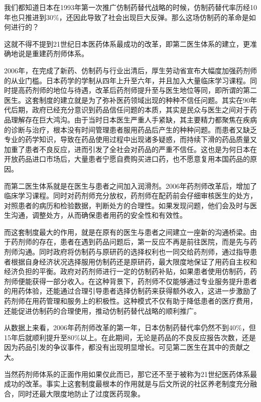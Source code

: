 我们都知道日本在1993年第一次推广仿制药替代战略的时候，仿制药替代率历经10年也只推进到30\%，还因此导致了社会出现巨大反弹。那么这场仿制药的革命是如何进行的？

这就不得不提到21世纪日本医药体系最成功的改革，即第二医生体系的建立，更准确地说是重建药剂师体系。

2006年，在完成了新药、仿制药与行业出清后，厚生劳动省宣布大幅度加强药剂师的从业门槛。日本药学的学制从四年上升至六年，并且加入大量临床学习课程。同时提高药剂师的地位与待遇，改革后药剂师提升至与医生地位等同，即所谓的第二医生。这套制度的建立就是为了弥补医药领域出现的种种不信任问题。其实在90年代后期，政府已经充分意识到药品信任问题的本质，其实是民众与医生之间对于药品理解存在巨大鸿沟。由于当时日本医生严重人手紧缺，其主要精力都聚焦在疾病的诊断与治疗，根本没有时间管理患者服用药品后产生的种种问题。而患者又缺乏专业的药学知识，导致在药品使用过程中出现诸多疑惑，而持续下滑的药品质量又加重了患者不良反应，进而引发了全社会对药品的严重不信任。这也是为何日本在开放药品进口市场后，大量患者宁愿自费购买进口药，也不愿意复用本国药品的原因。

而第二医生体系就是在医生与患者之间加入润滑剂。2006年药剂师改革后，增加了临床学习课程。同时对药剂师充分放权，药剂师在配药前会仔细审核医生的处方，对照患者的病历和检验数据，判断处方的合理性。如果发现问题，他们会及时与医生沟通，调整处方，从而确保患者用药的安全性和有效性。

而这套制度最大的作用，就是在原有的医生与患者之间建立一座新的沟通桥梁。由于药剂师的存在，患者在遇到药品问题后，第一反应不再是前往医院，而是先与药剂师沟通。同时政府将仿制药与原研药的选择权利也一同交给药剂师，通过指导患者根据自身经济状况选择服用仿制药还是原研药，最大限度地保证了用药自主权和经济负担的平衡。政府对药剂师进行一定的仿制药补贴，如果患者使用仿制药，药剂师便能获得一部分收入。在这种背景下，药剂师不仅能够通过专业服务提升患者的用药体验，还能通过合理引导患者选择仿制药来获得额外收入，这进一步激励了药剂师在用药管理和服务上的积极性。这种模式不仅有助于降低患者的医疗费用，还能促进仿制药的合理使用，推动仿制药替代战略的顺利推广。

从数据上来看，2006年药剂师改革的第一年，日本仿制药替代率仍然不到40\%，但15年后就顺利提升至80\%以上。在此期间，无论是药品的不良反应报告次数，还是因为药品引发的争议事件，都没有出现明显增长。可见第二医生在其中的贡献之大。

当然药剂师体系的正面作用如果仅此而已，那它还不至于被称为21世纪医药体系最成功的改革。事实上这套制度最根本的作用就是与后文所说的社区养老制度充分融合，同时还最大限度地防止了过度医药现象。

